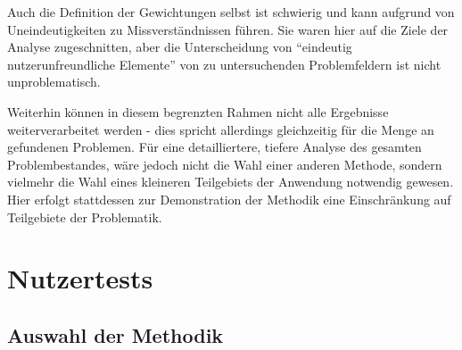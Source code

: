 \documentclass[
  12pt,
  ngerman,
  a4paper,
]{article}
\begin{document}
Auch die Definition der Gewichtungen selbst ist schwierig und kann
aufgrund von Uneindeutigkeiten zu Missverständnissen führen. Sie waren
hier auf die Ziele der Analyse zugeschnitten, aber die Unterscheidung
von ``eindeutig nutzerunfreundliche Elemente'' von zu untersuchenden
Problemfeldern ist nicht unproblematisch.

Weiterhin können in diesem begrenzten Rahmen nicht alle Ergebnisse
weiterverarbeitet werden - dies spricht allerdings gleichzeitig für die
Menge an gefundenen Problemen. Für eine detailliertere, tiefere Analyse
des gesamten Problembestandes, wäre jedoch nicht die Wahl einer anderen
Methode, sondern vielmehr die Wahl eines kleineren Teilgebiets der
Anwendung notwendig gewesen. Hier erfolgt stattdessen zur Demonstration
der Methodik eine Einschränkung auf Teilgebiete der Problematik.

\hypertarget{sec:lab}{%
\section{Nutzertests}\label{sec:lab}}

\hypertarget{auswahl-der-methodik-1}{%
\subsection{Auswahl der Methodik}\label{auswahl-der-methodik-1}}
\end{document}
